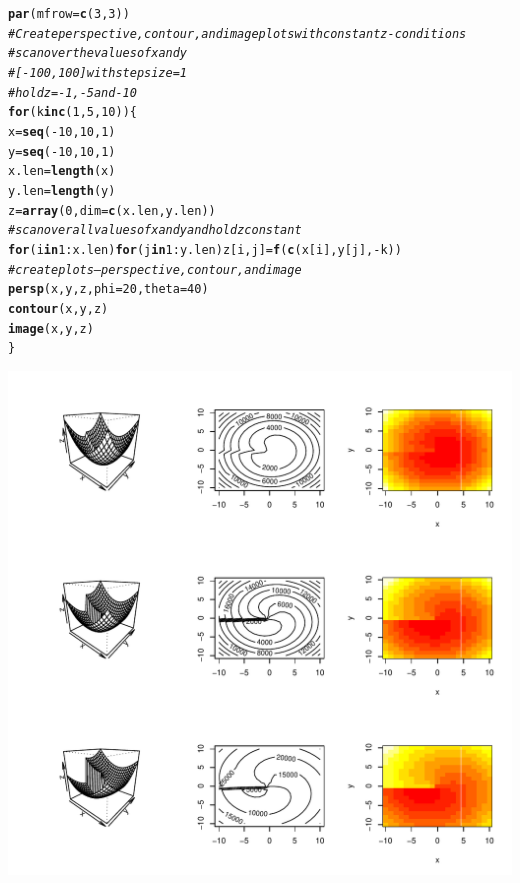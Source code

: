 \documentclass{article}\usepackage[]{graphicx}\usepackage[]{color}
\makeatletter
\def\maxwidth{ %
  \ifdim\Gin@nat@width>\linewidth
    \linewidth
  \else
    \Gin@nat@width
  \fi
}
\newcommand{\hlnum}[1]{\textcolor[rgb]{0.686,0.059,0.569}{#1}}%
\newcommand{\hlcom}[1]{\textcolor[rgb]{0.678,0.584,0.686}{\textit{#1}}}%
\newcommand{\hlopt}[1]{\textcolor[rgb]{0,0,0}{#1}}%
\newcommand{\hlstd}[1]{\textcolor[rgb]{0.345,0.345,0.345}{#1}}%
\newcommand{\hlkwa}[1]{\textcolor[rgb]{0.161,0.373,0.58}{\textbf{#1}}}%
\newcommand{\hlkwb}[1]{\textcolor[rgb]{0.69,0.353,0.396}{#1}}%
\newcommand{\hlkwc}[1]{\textcolor[rgb]{0.333,0.667,0.333}{#1}}%
\newcommand{\hlkwd}[1]{\textcolor[rgb]{0.737,0.353,0.396}{\textbf{#1}}}%
\newenvironment{kframe}{%
 \def\at@end@of@kframe{}%
 \ifinner\ifhmode%
  \def\at@end@of@kframe{\end{minipage}}%
  \begin{minipage}{\columnwidth}%
 \fi\fi%
 \def\FrameCommand##1{\hskip\@totalleftmargin \hskip-\fboxsep
 \colorbox{shadecolor}{##1}\hskip-\fboxsep
     \hskip-\linewidth \hskip-\@totalleftmargin \hskip\columnwidth}%
 \MakeFramed {\advance\hsize-\width
   \@totalleftmargin\z@ \linewidth\hsize
   \@setminipage}}%
 {\par\unskip\endMakeFramed%
 \at@end@of@kframe}
\newenvironment{knitrout}{}{} %
\makeatother
\begin{document}
\begin{knitrout}
\begin{kframe}
\begin{alltt}
\hlkwd{par}\hlstd{(}\hlkwc{mfrow}\hlstd{=}\hlkwd{c}\hlstd{(}\hlnum{3}\hlstd{,}\hlnum{3}\hlstd{))}
\hlcom{#Create perspective, contour, and image plots with constant z-conditions}
\hlcom{#scan over the values of x and y}
\hlcom{#[-100, 100] with step size = 1}
\hlcom{#hold z = -1, -5 and -10}
\hlkwa{for} \hlstd{(k} \hlkwa{in} \hlkwd{c}\hlstd{(}\hlnum{1}\hlstd{,}\hlnum{5}\hlstd{,}\hlnum{10}\hlstd{)) \{}
  \hlstd{x}\hlkwb{=}\hlkwd{seq}\hlstd{(}\hlopt{-}\hlnum{10}\hlstd{,}\hlnum{10}\hlstd{,}\hlnum{1}\hlstd{)}
  \hlstd{y}\hlkwb{=}\hlkwd{seq}\hlstd{(}\hlopt{-}\hlnum{10}\hlstd{,}\hlnum{10}\hlstd{,}\hlnum{1}\hlstd{)}
  \hlstd{x.len}\hlkwb{=} \hlkwd{length}\hlstd{(x)}
  \hlstd{y.len} \hlkwb{=} \hlkwd{length}\hlstd{(y)}
  \hlstd{z}\hlkwb{=}\hlkwd{array}\hlstd{(}\hlnum{0}\hlstd{,}\hlkwc{dim}\hlstd{=}\hlkwd{c}\hlstd{(x.len,y.len))}
  \hlcom{#scan over all values of x and y and hold z constant}
  \hlkwa{for} \hlstd{(i} \hlkwa{in} \hlnum{1}\hlopt{:}\hlstd{x.len)} \hlkwa{for} \hlstd{(j} \hlkwa{in} \hlnum{1}\hlopt{:}\hlstd{y.len) z[i,j]} \hlkwb{=} \hlkwd{f}\hlstd{(}\hlkwd{c}\hlstd{(x[i],y[j],}\hlopt{-}\hlstd{k))}
    \hlcom{#create plots -- perspective, contour, and image}
    \hlkwd{persp}\hlstd{(x, y, z,} \hlkwc{phi} \hlstd{=} \hlnum{20}\hlstd{,} \hlkwc{theta} \hlstd{=} \hlnum{40}\hlstd{)}
    \hlkwd{contour}\hlstd{(x, y, z)}
    \hlkwd{image}\hlstd{(x, y, z)}
\hlstd{\}}
\end{alltt}
\end{kframe}
\includegraphics[width=\maxwidth]{figure/unnamed-chunk-4-1} 

\end{knitrout}
\end{document}
